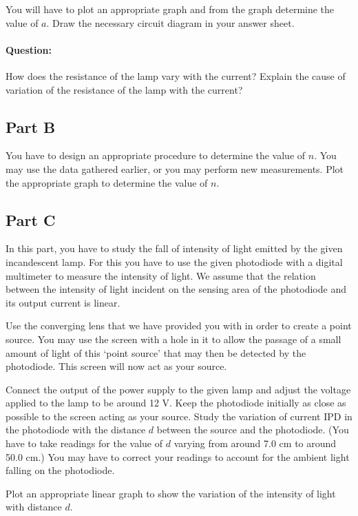 You will have to plot an appropriate graph and from the graph determine the value of $a$. Draw the necessary circuit diagram in your answer sheet.

\paragraph{Question:} How does the resistance of the lamp vary with the current?  Explain the cause of variation of the resistance of the lamp with the current?

\subsection*{Part B}

You have to design an appropriate procedure to determine the value of $n$. You may use the data gathered earlier, or you may perform new measurements. Plot the appropriate graph to determine the value of $n$.

\subsection*{Part C}

In this part, you have to study the fall of intensity of light emitted by the given incandescent lamp.  For this you have to use the given photodiode with a digital multimeter to measure the intensity of light. We assume that the relation between the intensity of light incident on the sensing area of the photodiode and its output current is linear. 

Use the converging lens that we have provided you with in order to create a point source. You may use the screen with a hole in it to allow the passage of a small amount of light of this `point source' that may then be detected by the photodiode. This screen will now act as your source.

Connect the output of the power supply to the given lamp and adjust the voltage applied to the lamp to be around 12 V. Keep the photodiode initially as close as possible to the screen acting as your source.  Study the variation of current IPD in the photodiode with the distance $d$ between the source and the photodiode. (You have to take readings for the value of $d$ varying from around 7.0 cm to around 50.0 cm.) You may have to correct your readings to account for the ambient light falling on the photodiode. 

Plot an appropriate linear graph to show the variation of the intensity of light with distance $d$.

